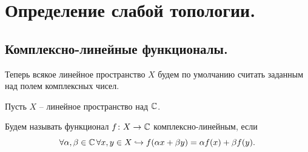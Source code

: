 \chapter{Определение слабой топологии.}
\section{Комплексно-линейные функционалы.}
\begin{note}
    Теперь всякое линейное пространство $X$ будем по умолчанию считать заданным над полем комплексных чисел.
\end{note}
\begin{definition}
    Пусть $X$ -- линейное пространство над $\mathbb{C}$.
    
    Будем называть функционал $f\colon X \to \mathbb{C}$ комплексно-линейным, если
    \[
        \forall \alpha, \beta \in \mathbb{C}\, \forall x, y \in X \hookrightarrow f(\alpha x + \beta y) = \alpha f(x) + \beta f(y).
    \]
\end{definition}
